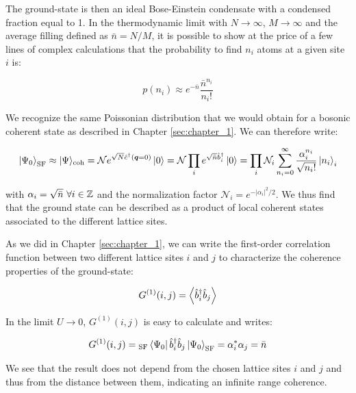 \noindent The ground-state is then an ideal Bose-Einstein condensate with a condensed fraction equal to 1. In the thermodynamic limit with $N \to \infty$, $M \to \infty$ and the average filling defined as $\bar{n}=N/M$, it is possible to show at the price of a few lines of complex calculations \cite{gerbier_notes} that the probability to find $n_i$ atoms at a given site $i$ is:

\begin{equation}
    p\left(n_{i}\right) \approx e^{-\bar{n}} \frac{\bar{n}^{n_{i}}}{n_{i} !}
\end{equation}

\noindent We recognize the same Poissonian distribution that we would obtain for a bosonic coherent state as described in Chapter \ref{sec:chapter_1}. We can therefore write:

\begin{equation}
    \ket{\Psi_0}_{\mathrm{SF}} \approx |\Psi\rangle_{\mathrm{coh}}=\mathcal{N} e^{\sqrt{N} \hat{c}^{\dagger}(\bm{q}=0)} \ket{0} = \mathcal{N} \prod_{i} e^{\sqrt{\bar{n}} \hat{b}_{i}^{\dagger}} \ket{0} = \prod_{i} \mathcal{N}_{i} \sum_{n_{i}=0}^{\infty} \frac{\alpha_{i}^{n_{i}}}{\sqrt{n_{i} !}}\left|n_{i}\right\rangle_{i}
    \label{eq:ground-state_superfluid}
\end{equation}

\noindent with $\alpha_i=\sqrt{\bar{n}} \ \forall i \in \mathbb{Z}$ and the normalization factor $\mathcal{N}_{i}=e^{-\left|\alpha_{i}\right|^{2} / 2}$. We thus find that the ground state can be described as a product of local coherent states associated to the different lattice sites.

As we did in Chapter \ref{sec:chapter_1}, we can write the first-order correlation function between two different lattice sites $i$ and $j$ to characterize the coherence properties of the ground-state:

\begin{equation}
    G^{(1)}(i,j)= \left\langle\hat{b}^{\dagger}_i \hat{b}_j\right\rangle
\end{equation}

\noindent In the limit $U \to 0$, $G^{(1)}(i,j)$ is easy to calculate and writes:

\begin{equation}
    G^{(1)}(i,j)= {}_{\mathrm{SF}} \bra{\Psi_0} \hat{b}^{\dagger}_i \hat{b}_j \ket{\Psi_0}_{\mathrm{SF}} = \alpha^*_i \alpha_j = \bar{n}
\end{equation}

\noindent We see that the result does not depend from the chosen lattice sites $i$ and $j$ and thus from the distance between them, indicating an infinite range coherence.


